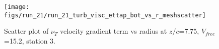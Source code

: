 \begin{figure}[H]
\centering
\texttt{[image: figs/run\_21/run\_21\_turb\_visc\_ettap\_bot\_vs\_r\_meshscatter]}
\caption{Scatter plot of $\nu_T$ velocity gradient term vs radius at $z/c$=7.75, $V_{free}$=15.2, station 3.}
\label{fig:run_21_turb_visc_ettap_bot_vs_r_meshscatter}
\end{figure}


